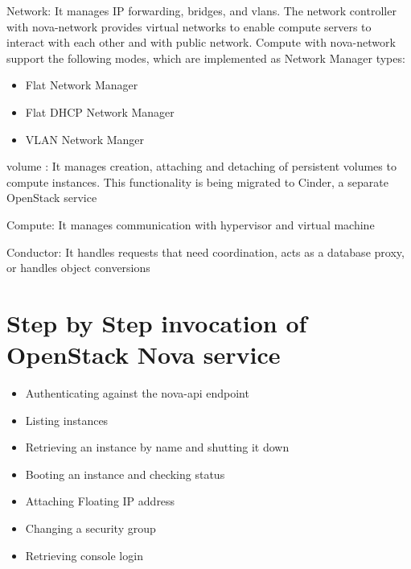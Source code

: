 \documentclass[9pt,twocolumn,twoside]{../../styles/osajnl}
\begin{document}
\begin{flushleft}

Network: It manages IP forwarding, bridges, and vlans. The network controller with nova-network provides virtual networks to enable compute servers to interact with each other and with public network. Compute with nova-network support the following modes, which are implemented as Network Manager types:
\begin{itemize}

\item Flat Network Manager

\item Flat DHCP Network Manager

\item VLAN Network Manger

\end{itemize}

\end{flushleft}


\begin{flushleft}

volume : It manages creation, attaching and detaching of persistent volumes to compute instances. This functionality is being migrated to Cinder, a separate OpenStack service

\end{flushleft}


\begin{flushleft}
Compute: It manages communication with hypervisor and virtual machine

\end{flushleft}


\begin{flushleft}

Conductor: It handles requests that need coordination, acts as a database proxy, or handles object conversions

\end{flushleft}




\section{Step by Step invocation of OpenStack Nova service}

\begin{itemize}

\item Authenticating against the nova-api endpoint

\item Listing instances

\item Retrieving an instance by name and shutting it down

\item Booting an instance and checking status

\item Attaching Floating IP address

\item Changing a security group 

\item Retrieving console login

\end{itemize}
\end{document}
